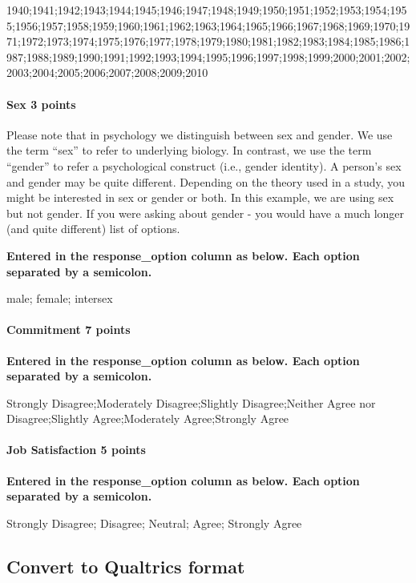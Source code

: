 \documentclass[
]{krantz}
\begin{document}
1940;1941;1942;1943;1944;1945;1946;1947;1948;1949;1950;1951;1952;1953;1954;1955;1956;1957;1958;1959;1960;1961;1962;1963;1964;1965;1966;1967;1968;1969;1970;1971;1972;1973;1974;1975;1976;1977;1978;1979;1980;1981;1982;1983;1984;1985;1986;1987;1988;1989;1990;1991;1992;1993;1994;1995;1996;1997;1998;1999;2000;2001;2002;2003;2004;2005;2006;2007;2008;2009;2010

\hypertarget{sex-3-points}{%
\paragraph{Sex 3 points}\label{sex-3-points}}

Please note that in psychology we distinguish between sex and gender. We use the term ``sex'' to refer to underlying biology. In contrast, we use the term ``gender'' to refer a psychological construct (i.e., gender identity). A person's sex and gender may be quite different. Depending on the theory used in a study, you might be interested in sex or gender or both. In this example, we are using sex but not gender. If you were asking about gender - you would have a much longer (and quite different) list of options.

\textbf{Entered in the response\_option column as below. Each option separated by a semicolon.}

male; female; intersex

\hypertarget{commitment-7-points}{%
\paragraph{Commitment 7 points}\label{commitment-7-points}}

\textbf{Entered in the response\_option column as below. Each option separated by a semicolon.}

Strongly Disagree;Moderately Disagree;Slightly Disagree;Neither Agree nor Disagree;Slightly Agree;Moderately Agree;Strongly Agree

\hypertarget{job-satisfaction-5-points}{%
\paragraph{Job Satisfaction 5 points}\label{job-satisfaction-5-points}}

\textbf{Entered in the response\_option column as below. Each option separated by a semicolon.}

Strongly Disagree; Disagree; Neutral; Agree; Strongly Agree

\hypertarget{convert-to-qualtrics-format}{%
\subsection{Convert to Qualtrics format}\label{convert-to-qualtrics-format}}
\end{document}
